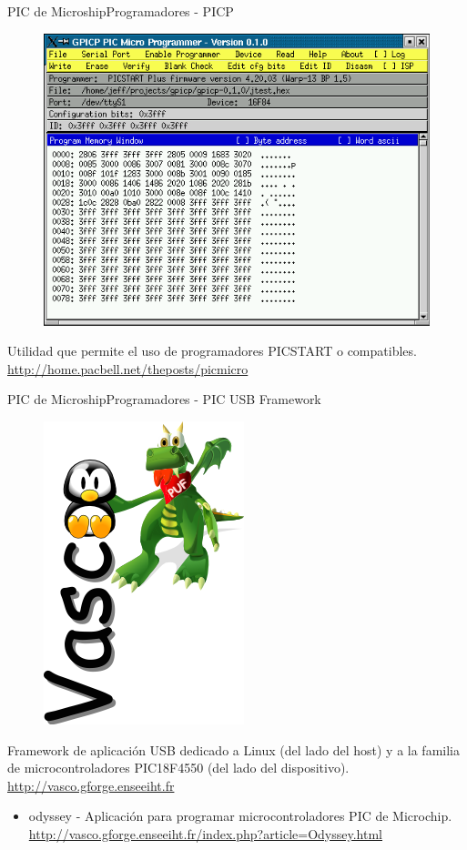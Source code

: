 \documentclass{beamer}
\begin{document}
\begin{frame}{PIC de Microship}{Programadores - PICP}
  \begin{figure}[!h]
    \centering
    \includegraphics[scale=0.3]{img/gpicp.png}
  \end{figure}
  Utilidad que permite el uso de programadores PICSTART o compatibles. \url{http://home.pacbell.net/theposts/picmicro}  
\end{frame}

\begin{frame}{PIC de Microship}{Programadores - PIC USB Framework}
  \begin{figure}[!h]
    \centering
    \includegraphics[scale=0.25]{img/vasco.png}
  \end{figure}
  Framework de aplicación USB dedicado a Linux (del lado del host) y a la familia de microcontroladores PIC18F4550 (del lado del dispositivo). \url{http://vasco.gforge.enseeiht.fr}
  \begin{itemize}
  \item \alert{odyssey} - Aplicación para programar microcontroladores PIC de Microchip. \url{http://vasco.gforge.enseeiht.fr/index.php?article=Odyssey.html} 
  \end{itemize}
\end{frame}
\end{document}
